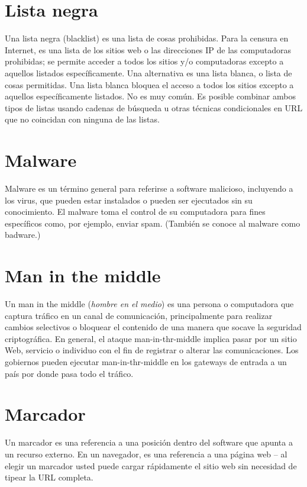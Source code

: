 \documentclass[10pt,a5paper,twoside,,]{book}
\begin{document}
\section{Lista negra}\label{lista-negra}

Una lista negra (blacklist) es una lista de cosas prohibidas. Para la
censura en Internet, es una lista de los sitios web o las direcciones IP
de las computadoras prohibidas; se permite acceder a todos los sitios
y/o computadoras excepto a aquellos listados específicamente. Una
alternativa es una lista blanca, o lista de cosas permitidas. Una lista
blanca bloquea el acceso a todos los sitios excepto a aquellos
específicamente listados. No es muy común. Es posible combinar ambos
tipos de listas usando cadenas de búsqueda u otras técnicas
condicionales en URL que no coincidan con ninguna de las listas.

\section{Malware}\label{malware}

Malware es un término general para referirse a software malicioso,
incluyendo a los virus, que pueden estar instalados o pueden ser
ejecutados sin su conocimiento. El malware toma el control de su
computadora para fines específicos como, por ejemplo, enviar spam.
(También se conoce al malware como badware.)

\section{Man in the middle}\label{man-in-the-middle}

Un man in the middle (\emph{hombre en el medio}) es una persona o
computadora que captura tráfico en un canal de comunicación,
principalmente para realizar cambios selectivos o bloquear el contenido
de una manera que socave la seguridad criptográfica. En general, el
ataque man-in-thr-middle implica pasar por un sitio Web, servicio o
individuo con el fin de registrar o alterar las comunicaciones. Los
gobiernos pueden ejecutar man-in-thr-middle en los gateways de entrada a
un país por donde pasa todo el tráfico.

\section{Marcador}\label{marcador}

Un marcador es una referencia a una posición dentro del software que
apunta a un recurso externo. En un navegador, es una referencia a una
página web -- al elegir un marcador usted puede cargar rápidamente el
sitio web sin necesidad de tipear la URL completa.
\end{document}
